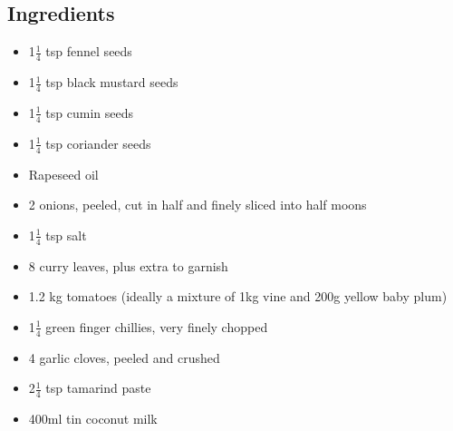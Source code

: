\documentclass{book}
\begin{document}
\subsection*{Ingredients}
\begin{itemize}
\item 1$\frac{1}{4}$ tsp fennel seeds
\item 1$\frac{1}{4}$ tsp black mustard seeds 
\item 1$\frac{1}{4}$ tsp cumin seeds 
\item 1$\frac{1}{4}$ tsp coriander seeds
\item Rapeseed oil 
\item 2 onions, peeled, cut in half and finely sliced into half moons
\item 1$\frac{1}{4}$ tsp salt 
\item 8 curry leaves, plus extra to garnish 
\item 1.2 kg tomatoes (ideally a mixture of 1kg vine and 200g yellow baby plum)
\item 1$\frac{1}{4}$ green finger chillies, very finely chopped
\item 4 garlic cloves, peeled and crushed 
\item 2$\frac{1}{4}$ tsp tamarind paste 
\item 400ml tin coconut milk 
\end{itemize}
\end{document}
